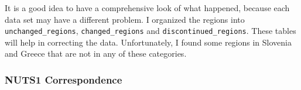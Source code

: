 \documentclass[]{article}
\newenvironment{Shaded}{\begin{snugshade}}{\end{snugshade}}
\newcommand{\CommentTok}[1]{\textcolor[rgb]{0.56,0.35,0.01}{\textit{#1}}}
\newcommand{\KeywordTok}[1]{\textcolor[rgb]{0.13,0.29,0.53}{\textbf{#1}}}
\newcommand{\NormalTok}[1]{#1}
\newcommand{\OperatorTok}[1]{\textcolor[rgb]{0.81,0.36,0.00}{\textbf{#1}}}
\newcommand{\StringTok}[1]{\textcolor[rgb]{0.31,0.60,0.02}{#1}}
\begin{document}
It is a good idea to have a comprehensive look of what happened, because
each data set may have a different problem. I organized the regions into
\texttt{unchanged\_regions}, \texttt{changed\_regions} and
\texttt{discontinued\_regions}. These tables will help in correcting the
data. Unfortunately, I found some regions in Slovenia and Greece that
are not in any of these categories.

\begin{Shaded}
\end{Shaded}

\hypertarget{nuts1-correspondence}{%
\subsubsection{NUTS1 Correspondence}\label{nuts1-correspondence}}
\end{document}

